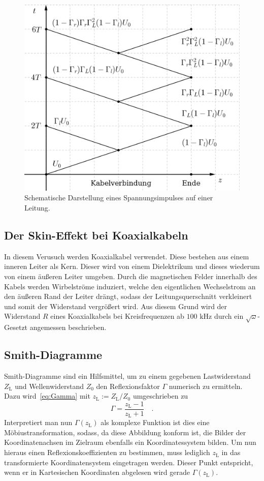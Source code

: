 \begin{figure}[htpb]
  \centering
  \includegraphics[scale=0.2]{bilder/fahrplan.jpg}
  \caption{Schematische Darstellung eines Spannungsimpulses auf einer Leitung.}
\label{fig:Impulsfahrplan}
\end{figure}

\subsection{Der Skin-Effekt bei Koaxialkabeln}
In diesem Verusuch werden Koaxialkabel verwendet. Diese bestehen aus einem inneren
Leiter als Kern. Dieser wird von einem Dielektrikum und dieses wiederum von einem
äußeren Leiter umgeben. Durch die magnetischen Felder innerhalb des Kabels werden
Wirbelströme induziert, welche den eigentlichen Wechselstrom an den äußeren Rand der
Leiter drängt, sodass der Leitungsquerschnitt verkleinert und somit der Widerstand
vergrößert wird. Aus diesem Grund wird der Widerstand $R$ eines Koaxialkabels bei
Kreisfrequenzen ab $100 \text{ kHz}$ durch ein $\sqrt{\omega}$-Gesetzt angemessen
beschrieben.
\subsection{Smith-Diagramme}
Smith-Diagramme sind ein Hilfsmittel, um zu einem gegebenen Lastwiderstand
$Z_\text{L}$ und Wellenwiderstand $Z_0$ den Reflexionsfaktor $\Gamma$ numerisch
zu ermitteln. Dazu wird~\eqref{eq:Gamma} mit $z_\text{L}:=Z_\text{L}/Z_0$
umgeschrieben zu
\begin{equation}
\Gamma = \frac{z_\text{L}-1}{z_\text{L}+1} \quad.
\end{equation}
Interpretiert man nun $\Gamma(z_\text{L})$ als komplexe Funktion ist dies eine
Möbiustransformation, sodass, da diese Abbildung konform ist, die Bilder der
Koordinatenachsen im Zielraum ebenfalls ein Koordinatessystem bilden. Um nun hieraus
einen Reflexionskoeffizienten zu bestimmen, muss lediglich $z_\text{L}$ in das
transformierte Koordinatensystem eingetragen werden. Dieser Punkt entspricht, wenn
er in Kartesischen Koordinaten abgelesen wird gerade $\Gamma(z_\text{L})$.

